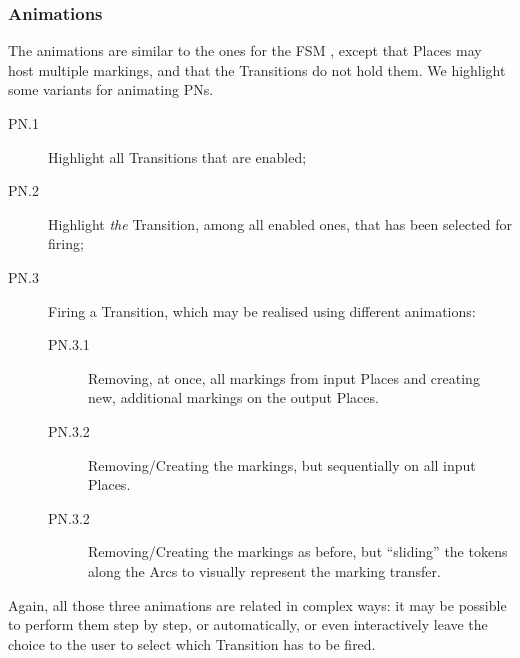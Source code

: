 \subsubsection{Animations}
\label{sec:Examples:PN:Animations}

The animations are similar to the ones for the \textsf{FSM} \DSL, except that 
\textsf{Place}s may host multiple \textsf{marking}s, and that the \textsf{Transition}s
do not hold them. We highlight some variants for animating \textsf{PN}s.

\begin{description}
   \item[PN.1] Highlight all \textsf{Transition}s that are enabled;
   \item[PN.2] Highlight \emph{the} \textsf{Transition}, among all enabled ones,
   that has been selected for firing;
   \item[PN.3] Firing a \textsf{Transition}, which may be realised using 
   different animations:
   \begin{description}
      \item[PN.3.1] Removing, at once, all markings from input \textsf{Place}s 
      and creating new, additional markings on the output \textsf{Place}s.
      \item[PN.3.2] Removing/Creating the markings, but sequentially on all input
      \textsf{Place}s.
      \item[PN.3.2] Removing/Creating the markings as before, but ``sliding'' the
      tokens along the \textsf{Arc}s to visually represent the marking transfer.
   \end{description}
\end{description}
Again, all those three animations are related in complex ways: it may be possible
to perform them step by step, or automatically, or even interactively leave the 
choice to the user to select which \textsf{Transition} has to be fired. 